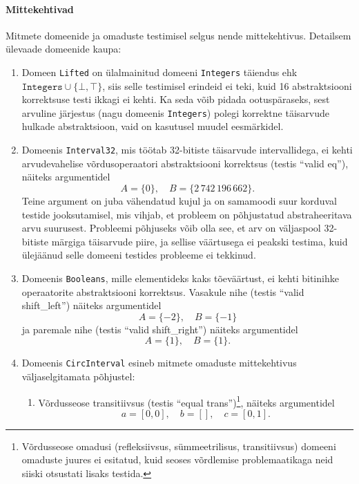 \documentclass[../thesis.tex]{subfiles}
\begin{document}
\paragraph{Mittekehtivad}
Mitmete domeenide ja omaduste testimisel selgus nende mittekehtivus. Detailsem ülevaade domeenide kaupa:
\begin{enumerate}
	\item Domeen \texttt{Lifted} on ülalmainitud domeeni \texttt{Integers} täiendus ehk $\texttt{Integers} \cup \{\bot, \top\}$, siis selle testimisel erindeid ei teki, kuid 16 abstraktsiooni korrektsuse testi ikkagi ei kehti. Ka seda võib pidada ootuspäraseks, sest arvuline järjestus (nagu domeenis \texttt{Integers}) polegi korrektne täisarvude hulkade abstraktsioon, vaid on kasutusel muudel eesmärkidel.

	\item Domeenis \texttt{Interval32}, mis töötab 32-bitiste täisarvude intervallidega, ei kehti arvudevahelise võrdusoperaatori abstraktsiooni korrektsus (testis \enquote{valid eq}), näiteks argumentidel
	\[
		A = \{0\},\quad B = \{2\,742\,196\,662\}. %
	\]
	Teine argument on juba vähendatud kujul ja on samamoodi suur korduval testide jooksutamisel, mis vihjab, et probleem on põhjustatud abstraheeritava arvu suurusest. Probleemi põhjuseks võib olla see, et arv on väljaspool 32-bitiste märgiga täisarvude piire, ja sellise väärtusega ei peakski testima, kuid ülejäänud selle domeeni testides probleeme ei tekkinud.

	\item Domeenis \texttt{Booleans}, mille elementideks kaks tõeväärtust, ei kehti bitinihke operaatorite abstraktsiooni korrektsus. Vasakule nihe (testis \enquote{valid shift\_left}) näiteks argumentidel
	\[
		A = \{-2\},\quad B = \{-1\} %
	\]
	ja paremale nihe (testis \enquote{valid shift\_right}) näiteks argumentidel
	\[
		A = \{1\}, \quad B = \{1\}. %
	\]

	\item Domeenis \texttt{CircInterval} esineb mitmete omaduste mittekehtivus väljaselgitamata põhjustel:
	\begin{enumerate}[nosep]
		\item Võrdusseose transitiivsus (testis \enquote{equal trans})\footnote{Võrdusseose omadusi (refleksiivsus, sümmeetrilisus, transitiivsus) domeeni omaduste juures ei esitatud, kuid seoses võrdlemise problemaatikaga neid siiski otsustati lisaks testida.}, näiteks argumentidel
		\[
			a = [0, 0],\quad b = [],\quad c = [0, 1]. %
		\]


\end{enumerate}
\end{enumerate}
\end{document}
